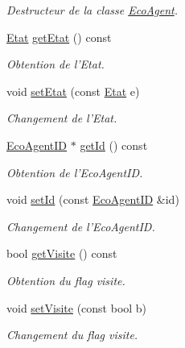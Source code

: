 \begin{CompactItemize}
\begin{CompactList}\small\item\em Destructeur de la classe \hyperlink{classEcoAgent}{EcoAgent}. \item\end{CompactList}\item 
\hyperlink{etat_8hpp_767b7a63d7677f92d697621b4166af1b}{Etat} \hyperlink{classEcoAgent_91160732f8c4dd585ac5d8ad69bf3891}{getEtat} () const 
\begin{CompactList}\small\item\em Obtention de l'Etat. \item\end{CompactList}\item 
void \hyperlink{classEcoAgent_e06a7430bd88705a327cf498c8420a2b}{setEtat} (const \hyperlink{etat_8hpp_767b7a63d7677f92d697621b4166af1b}{Etat} e)
\begin{CompactList}\small\item\em Changement de l'Etat. \item\end{CompactList}\item 
\hyperlink{classEcoAgentID}{EcoAgentID} $\ast$ \hyperlink{classEcoAgent_888101c39bee652681dffcb36bd9bb01}{getId} () const 
\begin{CompactList}\small\item\em Obtention de l'EcoAgentID. \item\end{CompactList}\item 
void \hyperlink{classEcoAgent_ef2dde1272916b9f3a8f5a663bf96f69}{setId} (const \hyperlink{classEcoAgentID}{EcoAgentID} \&id)
\begin{CompactList}\small\item\em Changement de l'EcoAgentID. \item\end{CompactList}\item 
bool \hyperlink{classEcoAgent_8156bc22f2daca635c4f2577e6b96849}{getVisite} () const 
\begin{CompactList}\small\item\em Obtention du flag visite. \item\end{CompactList}\item 
void \hyperlink{classEcoAgent_aa8d25798a3783276c07725bce711120}{setVisite} (const bool b)
\begin{CompactList}\small\item\em Changement du flag visite. \item\end{CompactList}\item 

\end{CompactItemize}
